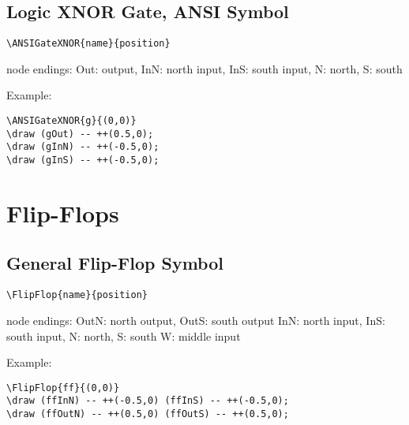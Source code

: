 \documentclass[parskip=full]{scrartcl}
\begin{document}
\subsection{Logic XNOR Gate, ANSI Symbol}

\begin{verbatim}
\ANSIGateXNOR{name}{position}
\end{verbatim}
node endings: Out: output,
              InN: north input, InS: south input,
              N: north, S: south

Example:\\
\begin{minipage}{0.8\textwidth}
\begin{verbatim}
\ANSIGateXNOR{g}{(0,0)}
\draw (gOut) -- ++(0.5,0);
\draw (gInN) -- ++(-0.5,0);
\draw (gInS) -- ++(-0.5,0);
\end{verbatim}
\end{minipage}
\begin{minipage}{0.19\textwidth}
\end{minipage}

\section{Flip-Flops}

\subsection{General Flip-Flop Symbol}

\begin{verbatim}
\FlipFlop{name}{position}
\end{verbatim}
node endings: OutN: north output, OutS: south output
              InN: north input, InS: south input,
              N: north, S: south
              W: middle input

Example:\\
\begin{minipage}{0.8\textwidth}
\begin{verbatim}
\FlipFlop{ff}{(0,0)}
\draw (ffInN) -- ++(-0.5,0) (ffInS) -- ++(-0.5,0);
\draw (ffOutN) -- ++(0.5,0) (ffOutS) -- ++(0.5,0);
\end{verbatim}
\end{minipage}
\begin{minipage}{0.19\textwidth}
\end{minipage}
\end{document}
